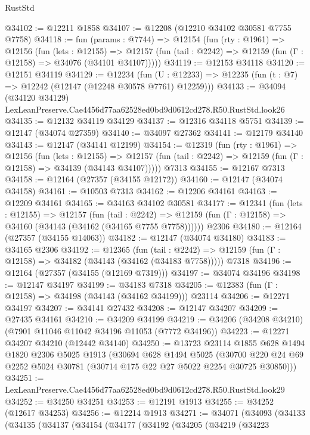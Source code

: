 \begin{lexlean}{RustStd}
\begin{coremodule}
@34102 := @12211 @1858
@34107 := @12208 (@12210 @34102 @30581 @7755 @7758)
@34118 := fun (params : @7744) =>
  @12154
    (fun (rty : @1961) =>
    @12156
      (fun (lets : @12155) =>
      @12157 (fun (tail : @2242) => @12159 (fun (Γ : @12158) => @34076 (@34101 @34107)))))
@34119 := @12153 @34118
@34120 := @12151 @34119
@34129 := @12234
    (fun (U : @12233) => @12235 (fun (t : @7) => @12242 (@12147 (@12248 @30578 @7761) @12259)))
@34133 := @34094
    (@34120 @34129)
    LexLeanPreserve.Cae4456d77aa62528ed0bd9d0612cd278.R50.RustStd.look26
@34135 := @12132 @34119 @34129
@34137 := @12316 @34118 @5751
@34139 := @12147 (@34074 @27359)
@34140 := @34097 @27362
@34141 := @12179 @34140
@34143 := @12147 (@34141 @12199)
@34154 := @12319
    (fun (rty : @1961) =>
    @12156
      (fun (lets : @12155) =>
      @12157 (fun (tail : @2242) => @12159 (fun (Γ : @12158) => @34139 (@34143 @34107)))))
    @7313
@34155 := @12167 @7313
@34158 := @12164 (@27357 (@34155 @12172))
@34160 := @12147 (@34074 @34158)
@34161 := @10503 @7313
@34162 := @12206 @34161
@34163 := @12209 @34161
@34165 := @34163 @34102 @30581
@34177 := @12341
    (fun (lets : @12155) =>
    @12157
      (fun (tail : @2242) =>
      @12159 (fun (Γ : @12158) => @34160 (@34143 (@34162 (@34165 @7755 @7758))))))
    @2306
@34180 := @12164 (@27357 (@34155 @14063))
@34182 := @12147 (@34074 @34180)
@34183 := @34165 @2306
@34192 := @12365
    (fun (tail : @2242) => @12159 (fun (Γ : @12158) => @34182 (@34143 (@34162 (@34183 @7758)))))
    @7318
@34196 := @12164 (@27357 (@34155 (@12169 @7319)))
@34197 := @34074 @34196
@34198 := @12147 @34197
@34199 := @34183 @7318
@34205 := @12383 (fun (Γ : @12158) => @34198 (@34143 (@34162 @34199))) @23114
@34206 := @12271 @34197
@34207 := @34141 @27432
@34208 := @12147 @34207
@34209 := @27435 @34161
@34210 := @34209 @34199
@34219 := @34206 (@34208 @34210) (@7901 @11046 @11042 @34196 @11053 (@7772 @34196))
@34223 := @12271 @34207 @34210 (@12442 @34140)
@34250 := @13723
    @23114
    @1855
    @628
    @1494
    @1820
    @2306
    @5025
    @1913
    (@30694
      @628
      @1494
      @5025
      (@30700 @220 @24 @69 @2252 @5024 @30781 (@30714 @175 @22 @27 @5022 @2254 @30725 @30850)))
@34251 := LexLeanPreserve.Cae4456d77aa62528ed0bd9d0612cd278.R50.RustStd.look29
@34252 := @34250 @34251
@34253 := @12191 @1913
@34255 := @34252 (@12617 @34253)
@34256 := @12214 @1913
@34271 := @34071
    (@34093
      (@34133
        (@34135
          (@34137
            (@34154
              (@34177
                (@34192
                  (@34205
                    (@34219
                      (@34223

\end{coremodule}
\end{lexlean}
